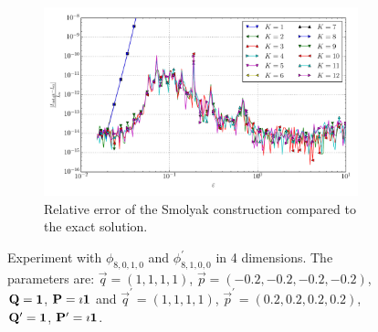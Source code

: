 \documentclass[a4paper,10pt]{article}
\begin{document}
\begin{figure}[ht!]
\begin{subfigure}[t]{0.5\linewidth}
    \includegraphics[width=\linewidth]{./plots/tp_sg_4d_conv_eps_(8,0,1,0)_(8,1,0,0)_err_rel_nsd_gk.pdf}
    \caption{Relative error of the Smolyak construction compared to the exact solution.}
    \label{fig:tp_sg_4d_conv_eps_8010_8100_err_rel_nsd_gk}
  \end{subfigure}
  \label{fig:tp_sg_4d_conv_eps_8010_8100}
  \caption{Experiment with $\phi_{8,0,1,0}$ and $\phi_{8,1,0,0}^{\prime}$
  in 4 dimensions.
  The parameters are:
  $\vec{q} = (1, 1, 1, 1)$,
  $\vec{p} = (-0.2, -0.2, -0.2, -0.2)$,
  $\mathbf{Q} = \mathbf{1}$,
  $\mathbf{P} = \imath \mathbf{1}$
  and
  $\vec{q}^\prime = (1, 1, 1, 1)$,
  $\vec{p}^\prime = (0.2, 0.2, 0.2, 0.2)$,
  $\mathbf{Q}^\prime = \mathbf{1}$,
  $\mathbf{P}^\prime = \imath \mathbf{1}$.}
\end{figure}
\end{document}

